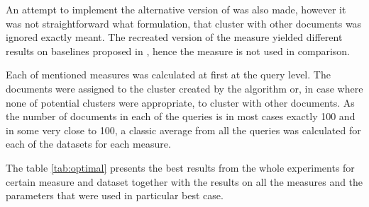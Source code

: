 \documentclass[a4paper, 12pt, oneside]{Thesis} %
\begin{document}
An attempt to implement the alternative version of  was also made, however it was not straightforward what formulation, that cluster with other documents was ignored exactly meant. The recreated version of the measure yielded different results on baselines proposed in \cite{di2013clustering}, hence the measure is not used in comparison.

Each of mentioned measures was calculated at first at the query level. The documents were assigned to the cluster created by the algorithm or, in case where none of potential clusters were appropriate, to cluster with other documents. As the number of documents in each of the queries is in most cases exactly 100 and in some very close to 100, a classic average from all the queries was calculated for each of the datasets for each measure.

The table \ref{tab:optimal} presents the best results from the whole experiments for certain measure and dataset together with the results on all the measures and the parameters that were used in particular best case.
\end{document}
